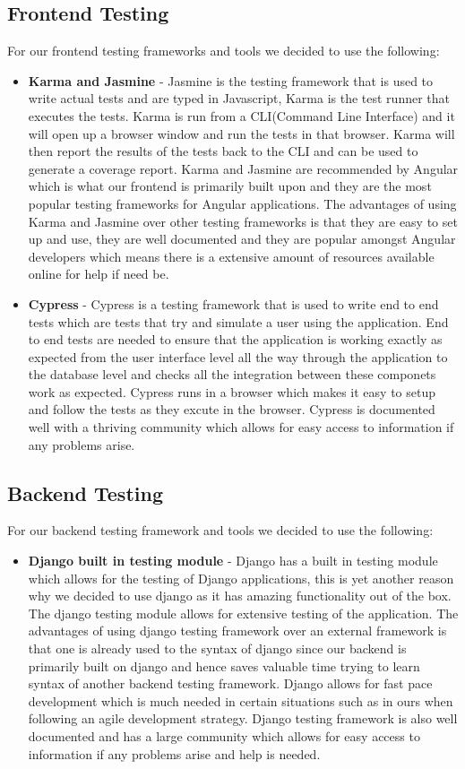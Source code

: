\documentclass[12pt]{article}
\begin{document}
\subsection{Frontend Testing}
For our frontend testing frameworks and tools we decided to use the following:
\begin{itemize}
    \item \textbf{Karma and Jasmine} - Jasmine is the testing framework that is used to write actual tests and are typed in Javascript, Karma is the test runner that executes the tests. Karma is run from a CLI(Command Line Interface) and it will open up a browser window and run the tests in that browser. Karma will then report the results of the tests back to the CLI and can be used to generate a coverage report. Karma and Jasmine are recommended by Angular which is what our frontend is primarily built upon and they are the most popular testing frameworks for Angular applications. The advantages of using Karma and Jasmine over other testing frameworks is that they are easy to set up and use, they are well documented and they are popular amongst Angular developers which means there is a extensive amount of resources available online for help if need be.
    \item \textbf{Cypress} - Cypress is a testing framework that is used to write end to end tests which are tests that try and simulate a user using the application. End to end tests are needed to ensure that the application is working exactly as expected from the user interface level all the way through the application to the database level and checks all the integration between these componets work as expected. Cypress runs in a browser which makes it easy to setup and follow the tests as they excute in the browser. Cypress is documented well with a thriving community which allows for easy access to information if any problems arise.
\end{itemize}

\subsection{Backend Testing}
For our backend testing framework and tools we decided to use the following:
\begin{itemize}
    \item \textbf{Django built in testing module} - Django has a built in testing module which allows for the testing of Django applications, this is yet another reason why we decided to use django as it has amazing functionality out of the box. The django testing module allows for extensive testing of the application. The advantages of using django testing framework over an external framework is that one is already used to the syntax of django since our backend is primarily built on django and hence saves valuable time trying to learn syntax of another backend testing framework. Django allows for fast pace development which is much needed in certain situations such as in ours when following an agile development strategy. Django testing framework is also well documented and has a large community which allows for easy access to information if any problems arise and help is needed.
\end{itemize}
\end{document}
